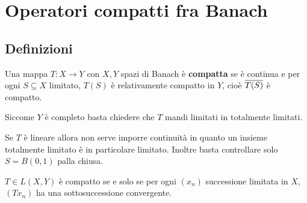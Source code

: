 \chapter{Operatori compatti fra Banach}

\section{Definizioni}
\begin{definition}
Una mappa $T:X\to Y$ con $X,Y$ spazi di Banach \`e \textbf{compatta} se \`e continua e per ogni $S\subseteq X$ limitato, $T(S)$ \`e relativamente compatto in $Y$, cio\`e $\overline{T(S)}$ \`e compatto.
\end{definition}
\begin{remark}
Siccome $Y$ \`e completo basta chiedere che $T$ mandi limitati in totalmente limitati.
\end{remark}

\begin{remark}
Se $T$ \`e lineare allora non serve imporre continuit\`a in quanto un insieme totalmente limitato \`e in particolare limitato. Inoltre basta controllare solo $S=B(0,1)$ palla chiusa.
\end{remark}

\begin{remark}
$T\in L(X,Y)$ \`e compatto se e solo se per ogni $(x_n)$ successione limitata in $X$, $(Tx_n)$ ha una sottosuccessione convergente.
\end{remark}

